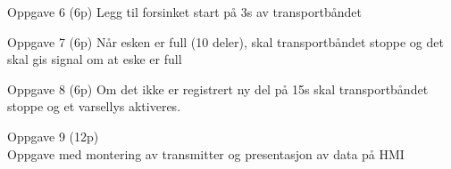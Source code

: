 \vskip 10pt 
Oppgave 6 (6p) %
\vskip 2.5pt 
Legg til forsinket start på 3s av transportbåndet 

\vskip 10pt 
Oppgave 7 (6p) %
\vskip 2.5pt 
Når esken er full (10 deler), skal transportbåndet stoppe og det skal gis signal om at eske er full

\vskip 10pt 
Oppgave 8 (6p) %
\vskip 2.5pt 
Om det ikke er registrert ny del på 15s skal transportbåndet stoppe og et varsellys aktiveres. 
\vskip 1cm

\vskip 5pt 
\vskip 0.5cm


\vfil\eject
Oppgave 9 (12p) \\ %
Oppgave med montering av transmitter og presentasjon av data på HMI

\vskip 5pt 


